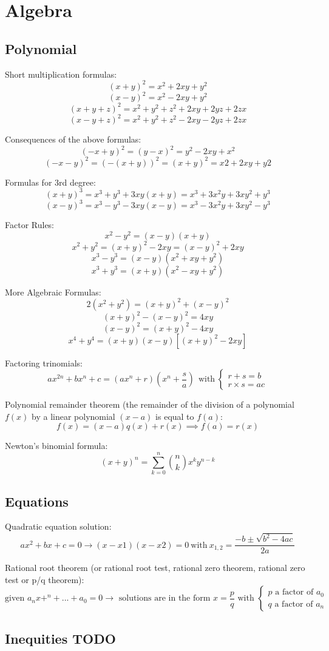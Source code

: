 \chapter{Algebra}

\section{Polynomial}
Short multiplication formulas:
$$(x + y)^2 = x^2 + 2xy + y^2$$
$$(x - y)^2 = x^2 - 2xy + y^2$$ 
$$(x + y + z)^2 = x^2 + y^2 + z^2 + 2xy + 2yz + 2zx$$ 
$$(x - y + z)^2 = x^2 + y^2 + z^2 - 2xy - 2yz + 2zx$$ 

Consequences of the above formulas:
$$(-x + y)^2 = (y - x)^2 = y^2 - 2xy + x^2$$
$$(-x - y)^2 = (-(x + y))^2 = (x + y)^2 = x2 + 2xy + y2$$

Formulas for 3rd degree:
$$(x + y)^3 = x^3 + y^3 + 3xy(x + y) = x^3 + 3x^2y + 3xy^2 + y^3$$
$$(x - y)^3 = x^3 - y^3 - 3xy(x - y) = x^3 - 3x^2y + 3xy^2 - y^3$$

Factor Rules:
$$x^2 - y^2 = (x - y)(x + y)$$
$$x^2 + y^2 = (x + y)^2 - 2xy = (x - y)^2 + 2xy$$
$$x^3 - y^3 = (x - y)(x^2 + xy + y^2)$$
$$x^3 + y^3 = (x + y)(x^2 - xy + y^2)$$

More Algebraic Formulas:
$$2(x^2 + y^2) = (x + y)^2 + (x - y)^2$$
$$(x + y)^2 - (x - y)^2 = 4xy$$
$$(x - y)^2 = (x + y)^2 - 4xy$$
$$x^4 + y^4 = (x + y)(x - y)[(x + y)^2 - 2xy]$$

Factoring trinomials:
$$ ax^{2n} + bx^n + c = (ax^n + r)(x^n + \frac{s}{a}) ~~ \text{with} ~ \begin{cases} 
                                                                  r + s = b \\
                                                                  r \times s = ac
                                                                 \end{cases}
$$

Polynomial remainder theorem (the remainder of the division of a polynomial $f(x)$ by a linear polynomial ${(x-a)}$ is equal to $f(a)$:
$$ f(x) = (x-a)q(x) + r(x) \implies f(a) = r(x) $$

Newton's binomial formula:
\[ (x+y)^n = \sum_{k=0}^{n}\binom{n}{k}x^ky^{n-k} \]

\section{Equations}
Quadratic equation solution:
$$ ax^2 + bx + c = 0 \rightarrow (x - x1)(x - x2) = 0 ~\text{with}~ x_{1,2}=\frac{-b\pm\sqrt{b^2-4ac}}{2a}$$

Rational root theorem (or rational root test, rational zero theorem, rational zero test or p/q theorem): 
$$
\text{given } a_nx+^n+...+a_0=0 \rightarrow \text{ solutions are in the form } x=\frac{p}{q} \text{ with } \begin{cases}
p \text{ a factor of } a_0 \\
q \text{ a factor of } a_n
\end{cases}
$$


\section{Inequities TODO}